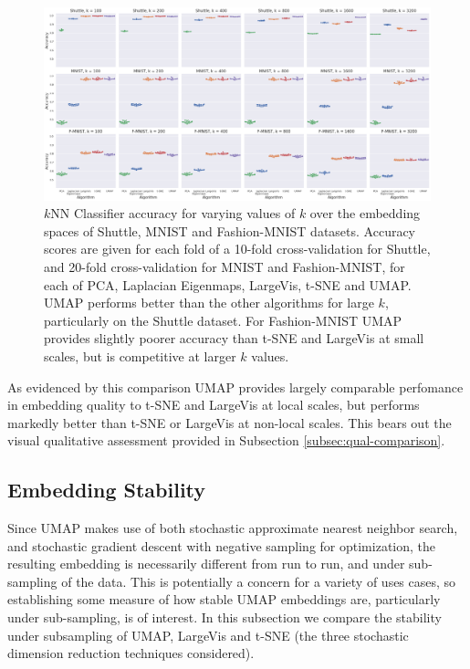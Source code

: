 \documentclass[12pt]{article}
\begin{document}
\begin{figure}[!hptb]
    \centering
    \includegraphics[width=\textwidth]{large_data_crossval.png}
    \caption{$k$NN Classifier accuracy for varying values of $k$ over the embedding spaces of Shuttle, MNIST and Fashion-MNIST datasets. Accuracy scores are given for each fold of a 10-fold cross-validation for
     Shuttle, and 20-fold cross-validation for MNIST and Fashion-MNIST, for each of PCA, Laplacian Eigenmaps, LargeVis, t-SNE and UMAP. UMAP performs better than the other algorithms for large $k$, particularly on the Shuttle dataset. For Fashion-MNIST UMAP provides slightly poorer accuracy than t-SNE and LargeVis at small scales, but is competitive at larger $k$ values.}
    \label{fig:knn_crossval_large_data}
\end{figure}

As evidenced by this comparison UMAP provides largely comparable perfomance in embedding quality to t-SNE and LargeVis at local scales, but performs markedly better than t-SNE or LargeVis at non-local scales. This bears out the visual qualitative assessment provided in Subsection \ref{subsec:qual-comparison}.

\subsection{Embedding Stability}

Since UMAP makes use of both stochastic approximate nearest neighbor search, and stochastic gradient descent with negative sampling for optimization, the resulting embedding is necessarily different from run to run, and under sub-sampling of the data. This is potentially a concern for a variety of uses cases, so establishing some measure of how stable UMAP embeddings are, particularly under sub-sampling, is of interest. In this subsection we compare the stability under subsampling of UMAP, LargeVis and t-SNE (the three stochastic dimension reduction techniques considered).
\end{document}
